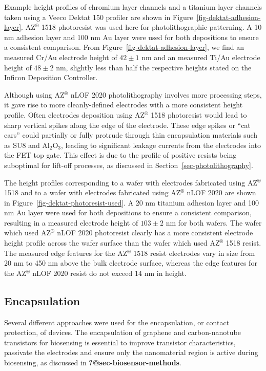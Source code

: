 \documentclass[
  a4paper,
]{scrbook}
\begin{document}
Example height profiles of chromium layer channels and a titanium layer
channels taken using a Veeco Dektat 150 profiler are shown in
Figure~\ref{fig-dektat-adhesion-layer}. AZ\(^\circledR\) 1518
photoresist was used here for photolithographic patterning. A 10 nm
adhesion layer and 100 nm Au layer were used for both depositions to
ensure a consistent comparison. From
Figure~\ref{fig-dektat-adhesion-layer}, we find an measured Cr/Au
electrode height of \(42\pm1\) nm and an measured Ti/Au electrode height
of \(48\pm2\) nm, slightly less than half the respective heights stated
on the Inficon Deposition Controller.

Although using AZ\(^\circledR\) nLOF 2020 photolithography involves more
processing steps, it gave rise to more cleanly-defined electrodes with a
more consistent height profile. Often electrodes deposition using
AZ\(^\circledR\) 1518 photoresist would lead to sharp vertical spikes
along the edge of the electrode. These edge spikes or ``cat ears'' could
partially or fully protrude through thin encapsulation materials such as
SU8 and Al\(_2\)O\(_3\), leading to significant leakage currents from
the electrodes into the FET top gate. This effect is due to the profile
of positive resists being suboptimal for lift-off processes, as
discussed in Section~\ref{sec-photolithography}.

The height profiles corresponding to a wafer with electrodes fabricated
using AZ\(^\circledR\) 1518 and to a wafer with electrodes fabricated
using AZ\(^\circledR\) nLOF 2020 are shown in
Figure~\ref{fig-dektat-photoresist-used}. A 20 nm titanium adhesion
layer and 100 nm Au layer were used for both depositions to ensure a
consistent comparison, resulting in a measured electrode height of
\(103\pm2\) nm for both wafers. The wafer which used AZ\(^\circledR\)
nLOF 2020 photoresist clearly has a more consistent electrode height
profile across the wafer surface than the wafer which used
AZ\(^\circledR\) 1518 resist. The measured edge features for the
AZ\(^\circledR\) 1518 resist electrodes vary in size from 20 nm to 450
nm above the bulk electrode surface, whereas the edge features for the
AZ\(^\circledR\) nLOF 2020 resist do not exceed 14 nm in height.

\hypertarget{sec-encapsulation}{%
\subsection{Encapsulation}\label{sec-encapsulation}}

Several different approaches were used for the encapsulation, or contact
protection, of devices. The encapsulation of graphene and
carbon-nanotube transistors for biosensing is essential to improve
transistor characteristics, passivate the electrodes and ensure only the
nanomaterial region is active during biosensing, as discussed in
\textbf{?@sec-biosensor-methods}.
\end{document}
